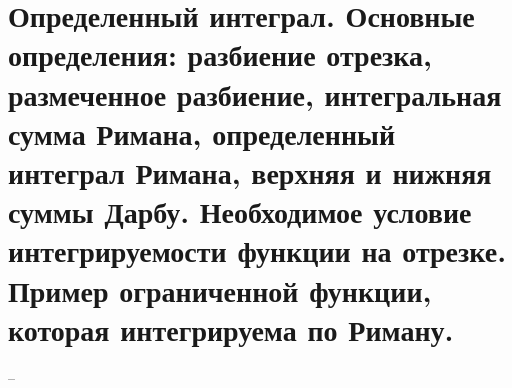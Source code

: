 \section{Определенный интеграл. Основные определения: разбиение отрезка, размеченное разбиение, интегральная сумма Римана, определенный интеграл Римана, верхняя и нижняя суммы Дарбу. Необходимое условие интегрируемости функции на отрезке. Пример ограниченной функции, которая интегрируема по Риману.}
--
\newline